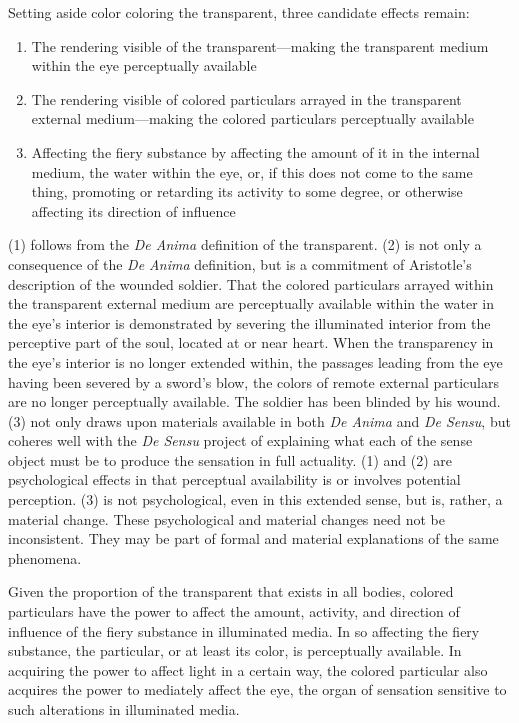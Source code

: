 Setting aside color coloring the transparent, three candidate effects remain:
\begin{enumerate}[(1)]
	\item The rendering visible of the transparent---making the transparent medium within the eye perceptually available
	\item The rendering visible of colored particulars arrayed in the transparent external medium---making the colored particulars perceptually available
	\item Affecting the fiery substance by affecting the amount of it in the internal medium, the water within the eye, or, if this does not come to the same thing, promoting or retarding its activity to some degree, or otherwise affecting its direction of influence
\end{enumerate}
(1) follows from the \emph{De Anima} definition of the transparent. (2) is not only a consequence of the \emph{De Anima} definition, but is a commitment of Aristotle's description of the wounded soldier. That the colored particulars arrayed within the transparent external medium are perceptually available within the water in the eye's interior is demonstrated by severing the illuminated interior from the perceptive part of the soul, located at or near heart. When the transparency in the eye's interior is no longer extended within, the passages leading from the eye having been severed by a sword's blow, the colors of remote external particulars are no longer perceptually available. The soldier has been blinded by his wound. (3) not only draws upon materials available in both \emph{De Anima} and \emph{De Sensu}, but coheres well with the \emph{De Sensu} project of explaining what each of the sense object must be to produce the sensation in full actuality. (1) and (2) are psychological effects in that perceptual availability is or involves potential perception. (3) is not psychological, even in this extended sense, but is, rather, a material change. These psychological and material changes need not be inconsistent. They may be part of formal and material explanations of the same phenomena. 

Given the proportion of the transparent that exists in all bodies, colored particulars have the power to affect the amount, activity, and direction of influence of the fiery substance in illuminated media. In so affecting the fiery substance, the particular, or at least its color, is perceptually available. In acquiring the power to affect light in a certain way, the colored particular also acquires the power to mediately affect the eye, the organ of sensation sensitive to such alterations in illuminated media.



